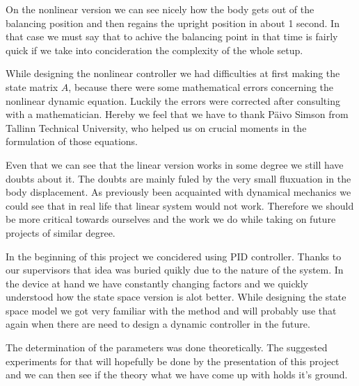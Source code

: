 On the nonlinear version we can see nicely how the body gets out of the balancing position and then regains the upright position in about 1 second.
In that case we must say that to achive the balancing point in that time is fairly quick if we take into concideration the complexity of the whole setup.

While designing the nonlinear controller we had difficulties at first making the state matrix $A$, because there were some mathematical errors concerning the nonlinear dynamic equation.
Luckily the errors were corrected after consulting with a mathematician.
Hereby we feel that we have to thank Päivo Simson from Tallinn Technical University, who helped us on crucial moments in the formulation of those equations.

Even that we can see that the linear version works in some degree we still have doubts about it.
The doubts are mainly fuled by the very small fluxuation in the body displacement.
As previously been acquainted with dynamical mechanics we could see that in real life that linear system would not work.
Therefore we should be more critical towards ourselves and the work we do while taking on future projects of similar degree.


In the beginning of this project we concidered using PID controller.
Thanks to our supervisors that idea was buried quikly due to the nature of the system.
In the device at hand we have constantly changing factors and we quickly understood how the state space version is alot better.
While designing the state space model we got very familiar with the method and will probably use that again when there are need to design a dynamic controller in the future.

The determination of the parameters was done theoretically. 
The suggested experiments for that will hopefully be done by the presentation of this project and we can then see if the theory what we have come up with holds it's ground.

